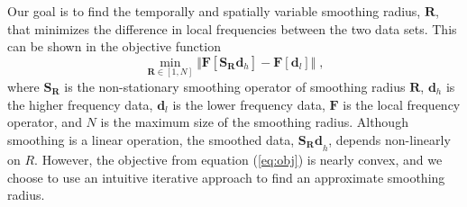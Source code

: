         Our goal is to find the temporally and spatially variable smoothing radius, $\mathbf{R}$, that
        minimizes the difference in local frequencies between the two data sets. This can be shown
        in the objective function
        \begin{equation}
                \label{eq:obj}
                \min_{\mathbf{R} \in [1,N]} \Big \Vert \mathbf{F}[ \mathbf{S}_{\mathbf{R}} \mathbf{d}_h ] - 
                \mathbf{F}[ \mathbf{d}_l] \Big \Vert\;,
        \end{equation}
        where $\mathbf{S}_\mathbf{R}$ is the non-stationary smoothing operator of smoothing radius
        $\mathbf{R}$, $\mathbf{d}_h$ is the higher frequency data, $\mathbf{d}_l$ is the lower
        frequency data, $\mathbf{F}$ is the local frequency operator, and $N$ is the maximum size of
        the smoothing radius.
        Although smoothing is a linear operation, the smoothed data, $\mathbf{S_R d}_h$, depends
        non-linearly on $R$. However, the objective from equation (\ref{eq:obj}) is nearly convex,
        and we choose to use an intuitive iterative approach to find an approximate smoothing
        radius.
                                
